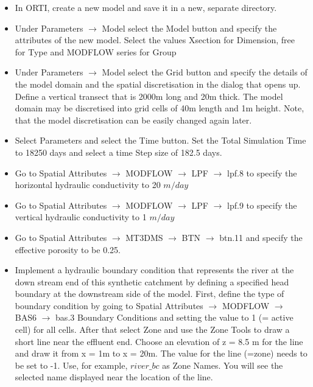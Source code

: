 \begin{itemize}

\item In ORTI, create a new model and save it in a new, separate directory.

\item Under {\color{blue}Parameters} $\rightarrow$ {\color{blue}Model} select the {\color{blue}Model} button and specify the attributes of the new model. Select the values {\color{blue}Xsection} for {\color{blue}Dimension}, {\color{blue}free} for {\color{blue}Type} 
and {\color{blue}MODFLOW series} for {\color{blue}Group} 

\item Under {\color{blue}Parameters} $\rightarrow$ {\color{blue}Model} select the {\color{blue}Grid} button and specify the details of the model domain and the spatial discretisation in the dialog that opens up. Define a vertical transect that is 2000m long and 20m thick. The model domain
may be discretised into grid cells of 40m length and 1m height. Note, that the 
model discretisation can be easily changed again later. 

\item Select {\color{blue}Parameters} and select the {\color{blue}Time} button.
Set the {\color{blue}Total Simulation Time} to 18250 days and select a time {\color{blue}Step size}
of 182.5 days. 

\item Go to {\color{blue}Spatial Attributes} $\rightarrow$ {\color{blue}MODFLOW} $\rightarrow$ {\color{blue}LPF} $\rightarrow$ {\color{blue}lpf.8} to specify the horizontal hydraulic conductivity to 20 $m/day$

\item Go to {\color{blue}Spatial Attributes} $\rightarrow$ {\color{blue}MODFLOW} $\rightarrow$ {\color{blue}LPF} $\rightarrow$ {\color{blue}lpf.9} to specify the vertical hydraulic conductivity to 1 $m/day$

\item Go to {\color{blue}Spatial Attributes} $\rightarrow$ {\color{blue}MT3DMS} $\rightarrow$ {\color{blue}BTN} $\rightarrow$ {\color{blue}btn.11} and specify the effective porosity to be 0.25.


\item Implement a hydraulic boundary condition that represents the river at the down stream end of this synthetic catchment by defining a specified head boundary at the downstream side of the model. First, define the type of boundary condition by going to {\color{blue}Spatial Attributes} $\rightarrow$ {\color{blue}MODFLOW} $\rightarrow$ {\color{blue}BAS6} $\rightarrow$ {\color{blue}bas.3 Boundary Conditions} and setting the value to 1 (= active cell) for all cells. After that select {\color{blue}Zone} and use the {\color{blue}Zone Tools} to draw a short line near the effluent end. Choose an elevation of z = 8.5 m for the line and draw it from x = 1m to x = 20m. 
The value for the line (=zone) needs to be set to -1. Use, for example,
$river\_bc$ as {\color{blue}Zone Names}. You will see the selected name displayed near 
the location of the line.
  

\end{itemize}
